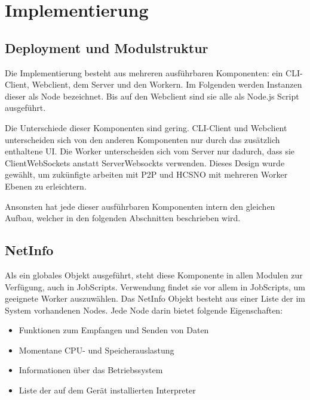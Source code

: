 
\chapter{Implementierung}

\section{Deployment und Modulstruktur}
Die Implementierung besteht aus mehreren ausführbaren Komponenten: ein CLI-Client, Webclient, dem Server und den Workern.
Im Folgenden werden Instanzen dieser als Node bezeichnet.
Bis auf den Webclient sind sie alle als Node.js Script ausgeführt.

Die Unterschiede dieser Komponenten sind gering.
CLI-Client und Webclient unterscheiden sich von den anderen Komponenten nur durch das zusätzlich enthaltene UI.
Die Worker unterscheiden sich vom Server nur dadurch, dass sie ClientWebSockets anstatt ServerWebsockts verwenden.
Dieses Design wurde gewählt, um zukünfigte arbeiten mit P2P und HCSNO mit mehreren Worker Ebenen zu erleichtern.

Ansonsten hat jede dieser ausführbaren Komponenten intern den gleichen Aufbau, welcher in den folgenden Abschnitten beschrieben wird.




\section{NetInfo}
Als ein globales Objekt ausgeführt, steht diese Komponente in allen Modulen zur Verfügung, auch in JobScripts.
Verwendung findet sie vor allem in JobScripts, um geeignete Worker auszuwählen.
Das NetInfo Objekt besteht aus einer Liste der im System vorhandenen Nodes.
Jede Node darin bietet folgende Eigenschaften:

\begin{itemize}
  \item Funktionen zum Empfangen und Senden von Daten
  \item Momentane CPU- und Speicherauslastung
  \item Informationen über das Betriebssystem
  \item Liste der auf dem Gerät installierten Interpreter
\end{itemize}

